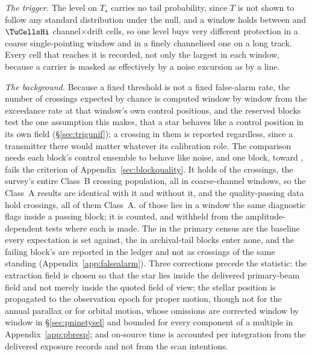 \emph{The trigger.} The level on $T_\star$ carries no tail probability, since
$T$ is not shown to follow any standard distribution under the null, and a
window holds between \TuCellsLo{} and $\TuCellsHi$ channel$\times$drift
cells, so one level buys very different protection in a coarse single-pointing
window and in a finely channelised one on a long track. Every cell that
reaches it is recorded, not only the largest in each window, because a carrier
is masked as effectively by a noise excursion as by a line.

\emph{The background.} Because a fixed threshold is not a fixed false-alarm
rate, the number of crossings expected by chance is computed window by window
from the exceedance rate at that window's own control positions, and the
reserved blocks test the one assumption this makes, that a star behaves like a
control position in its own field (\S\ref{sec:trigunif}); a crossing in them
is reported regardless, since a transmitter there would matter whatever its
calibration role. The comparison needs each block's control ensemble to behave
like noise, and one block, \BqFailBlock{} toward \BqFailStar, fails the
criterion of Appendix~\ref{sec:blockquality}. It holds \BqFailNCross{} of the
\NCross{} crossings, the survey's entire Class~B crossing population, all in
coarse-channel windows, so the Class~A results are identical with it and
without it, and the quality-passing data hold \EvNCrossQp{} crossings, all of
them Class~A. \BkFlagNCrossOther{} of those lies in a window the same
diagnostic flags inside a passing block; it is counted, and withheld from the
amplitude-dependent tests where each is made. The \CkNCrossCenA{} in the
primary census are the baseline every expectation is set against, the
\CeNTailCrossWord{} in archival-tail blocks enter none, and the failing
block's \BqFailNCross{} are reported in the ledger and not as crossings of the
same standing (Appendix~\ref{app:falsealarm}). Three corrections precede
the statistic: the extraction field is chosen so that the star lies inside the
delivered primary-beam field and not merely inside the quoted field of view;
the stellar position is propagated to the observation epoch for proper motion,
though not for the annual parallax or for orbital motion, whose omissions are
corrected window by window in \S\ref{sec:pninetysel} and bounded for every
component of a multiple in Appendix~\ref{app:pbresp}; and on-source time is
accounted per integration from the delivered exposure records and not from the
scan intentions.

